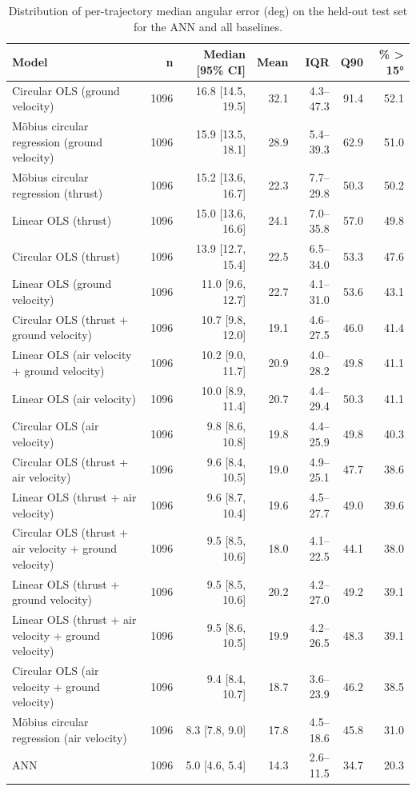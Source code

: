 \begin{table}[h!]
    \centering
    \caption{Distribution of per-trajectory median angular error (deg) on the held-out test set for the ANN and all baselines.}
    \label{tab:error_distribution}
    \begin{tabular}{@{}lrrrrrr@{}}
        \toprule
        Model & n & Median [95\% CI] & Mean & IQR & Q90 & \% > 15° \\
        \midrule
        Circular OLS (ground velocity) & 1096 & 16.8 [14.5, 19.5] & 32.1 & 4.3–47.3 & 91.4 & 52.1 \\
        Möbius circular regression (ground velocity) & 1096 & 15.9 [13.5, 18.1] & 28.9 & 5.4–39.3 & 62.9 & 51.0 \\
        Möbius circular regression (thrust) & 1096 & 15.2 [13.6, 16.7] & 22.3 & 7.7–29.8 & 50.3 & 50.2 \\
        Linear OLS (thrust) & 1096 & 15.0 [13.6, 16.6] & 24.1 & 7.0–35.8 & 57.0 & 49.8 \\
        Circular OLS (thrust) & 1096 & 13.9 [12.7, 15.4] & 22.5 & 6.5–34.0 & 53.3 & 47.6 \\
        Linear OLS (ground velocity) & 1096 & 11.0 [9.6, 12.7] & 22.7 & 4.1–31.0 & 53.6 & 43.1 \\
        Circular OLS (thrust + ground velocity) & 1096 & 10.7 [9.8, 12.0] & 19.1 & 4.6–27.5 & 46.0 & 41.4 \\
        Linear OLS (air velocity + ground velocity) & 1096 & 10.2 [9.0, 11.7] & 20.9 & 4.0–28.2 & 49.8 & 41.1 \\
        Linear OLS (air velocity) & 1096 & 10.0 [8.9, 11.4] & 20.7 & 4.4–29.4 & 50.3 & 41.1 \\
        Circular OLS (air velocity) & 1096 & 9.8 [8.6, 10.8] & 19.8 & 4.4–25.9 & 49.8 & 40.3 \\
        Circular OLS (thrust + air velocity) & 1096 & 9.6 [8.4, 10.5] & 19.0 & 4.9–25.1 & 47.7 & 38.6 \\
        Linear OLS (thrust + air velocity) & 1096 & 9.6 [8.7, 10.4] & 19.6 & 4.5–27.7 & 49.0 & 39.6 \\
        Circular OLS (thrust + air velocity + ground velocity) & 1096 & 9.5 [8.5, 10.6] & 18.0 & 4.1–22.5 & 44.1 & 38.0 \\
        Linear OLS (thrust + ground velocity) & 1096 & 9.5 [8.5, 10.6] & 20.2 & 4.2–27.0 & 49.2 & 39.1 \\
        Linear OLS (thrust + air velocity + ground velocity) & 1096 & 9.5 [8.6, 10.5] & 19.9 & 4.2–26.5 & 48.3 & 39.1 \\
        Circular OLS (air velocity + ground velocity) & 1096 & 9.4 [8.4, 10.7] & 18.7 & 3.6–23.9 & 46.2 & 38.5 \\
        Möbius circular regression (air velocity) & 1096 & 8.3 [7.8, 9.0] & 17.8 & 4.5–18.6 & 45.8 & 31.0 \\
        ANN & 1096 & 5.0 [4.6, 5.4] & 14.3 & 2.6–11.5 & 34.7 & 20.3 \\
        \bottomrule
    \end{tabular}
\end{table}
